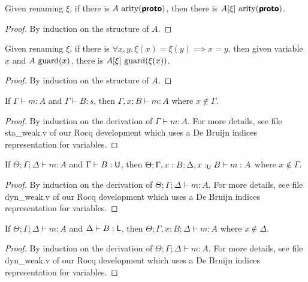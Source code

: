 \begin{lemma}
  Given renaming $\xi$, if there is $A~\text{arity}(\textbf{\textsf{proto}})$, then there is $A[\xi]~\text{arity}(\textbf{\textsf{proto}})$.
\end{lemma}
\begin{proof}
  By induction on the structure of $A$.
\end{proof}

\begin{lemma}
  Given renaming $\xi$, 
  if there is $\forall x, y, \xi(x) = \xi(y) \implies x = y$, 
  then given variable $x$ and $A~\text{guard}(x)$, there is $A[\xi]~\text{guard}(\xi(x))$.
\end{lemma}
\begin{proof}
  By induction on the structure of $A$.
\end{proof}

\begin{lemma}
  If $\Gamma \vdash m : A$ and $\Gamma \vdash B : s$, 
  then $\Gamma, x : B \vdash m : A$ where $x \not\in \Gamma$.
\end{lemma}
\begin{proof}
  By induction on the derivation of $\Gamma \vdash m : A$.
  For more details, see file \textsf{sta\_weak.v} of our Rocq development
  which uses a De Bruijn indices representation for variables.
\end{proof}

\begin{lemma}
  If $\Theta ; \Gamma ; \Delta \vdash m : A$ and $\Gamma \vdash B : \textsf{U}$,
  then $\Theta ; \Gamma, x : B ; \Delta, x :_{\textsf{U}} B \vdash m : A$ where $x \not\in \Gamma$.
\end{lemma}
\begin{proof}
  By induction on the derivation of $\Theta ; \Gamma ; \Delta \vdash m : A$.
  For more details, see file \textsf{dyn\_weak.v} of our Rocq development
  which uses a De Bruijn indices representation for variables.
\end{proof}

\begin{lemma}
  If $\Theta ; \Gamma ; \Delta \vdash m : A$ and $\Delta \vdash B : \textsf{L}$,
  then $\Theta ; \Gamma, x : B ; \Delta \vdash m : A$ where $x \not\in \Delta$.
\end{lemma}
\begin{proof}
  By induction on the derivation of $\Theta ; \Gamma ; \Delta \vdash m : A$.
  For more details, see file \textsf{dyn\_weak.v} of our Rocq development
  which uses a De Bruijn indices representation for variables.
\end{proof}

